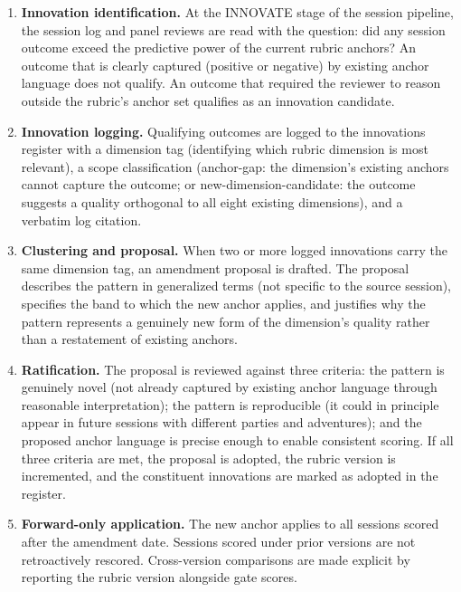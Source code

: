 \begin{enumerate}
  \item \textbf{Innovation identification.} At the INNOVATE stage of the session
  pipeline, the session log and panel reviews are read with the question: did any
  session outcome exceed the predictive power of the current rubric anchors? An outcome
  that is clearly captured (positive or negative) by existing anchor language does not
  qualify. An outcome that required the reviewer to reason outside the rubric's anchor
  set qualifies as an innovation candidate.

  \item \textbf{Innovation logging.} Qualifying outcomes are logged to the innovations
  register with a dimension tag (identifying which rubric dimension is most relevant),
  a scope classification (anchor-gap: the dimension's existing anchors cannot capture
  the outcome; or new-dimension-candidate: the outcome suggests a quality orthogonal to
  all eight existing dimensions), and a verbatim log citation.

  \item \textbf{Clustering and proposal.} When two or more logged innovations carry the
  same dimension tag, an amendment proposal is drafted. The proposal describes the
  pattern in generalized terms (not specific to the source session), specifies the band
  to which the new anchor applies, and justifies why the pattern represents a genuinely
  new form of the dimension's quality rather than a restatement of existing anchors.

  \item \textbf{Ratification.} The proposal is reviewed against three criteria: the
  pattern is genuinely novel (not already captured by existing anchor language through
  reasonable interpretation); the pattern is reproducible (it could in principle appear
  in future sessions with different parties and adventures); and the proposed anchor
  language is precise enough to enable consistent scoring. If all three criteria are
  met, the proposal is adopted, the rubric version is incremented, and the constituent
  innovations are marked as adopted in the register.

  \item \textbf{Forward-only application.} The new anchor applies to all sessions
  scored after the amendment date. Sessions scored under prior versions are not
  retroactively rescored. Cross-version comparisons are made explicit by reporting the
  rubric version alongside gate scores.
\end{enumerate}

